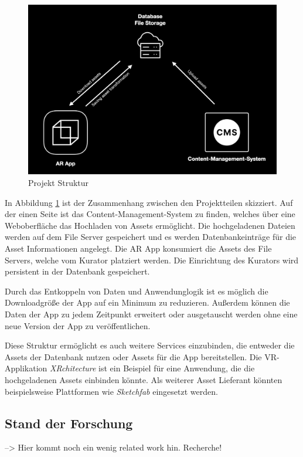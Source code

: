 \documentclass[titlepage, a4paper, 11pt]{scrartcl}
\begin{document}
  \begin{figure}[h]
    \centering
    \includegraphics[width=.6\textwidth]{project-structure}
    \caption{Projekt Struktur}
    \label{ProjektStruktur}
  \end{figure}

  In Abbildung \ref{ProjektStruktur} ist der Zusammenhang zwischen den Projektteilen skizziert.
  Auf der einen Seite ist das Content-Management-System zu finden, welches über eine Weboberfläche das Hochladen von Assets ermöglicht.
  Die hochgeladenen Dateien werden auf dem File Server gespeichert und es werden Datenbankeinträge für die Asset Informationen angelegt.
  Die AR App konsumiert die Assets des File Servers, welche vom Kurator platziert werden. Die Einrichtung des Kurators wird persistent in der Datenbank gespeichert. 
  
  Durch das Entkoppeln von Daten und Anwendunglogik ist es möglich die Downloadgröße der App auf ein Minimum zu reduzieren.
  Außerdem können die Daten der App zu jedem Zeitpunkt erweitert oder ausgetauscht werden ohne eine neue Version der App zu veröffentlichen. 

  Diese Struktur ermöglicht es auch weitere Services einzubinden, die entweder die Assets der Datenbank nutzen oder Assets für die App bereitstellen.
  Die VR-Applikation \textit{XRchitecture} ist ein Beispiel für eine Anwendung, die die hochgeladenen Assets einbinden könnte.
  Als weiterer Asset Lieferant könnten beispielsweise Plattformen wie \textit{Sketchfab} eingesetzt werden. 

    \subsection{Stand der Forschung}

    --> Hier kommt noch ein wenig related work hin. Recherche!
\end{document}
